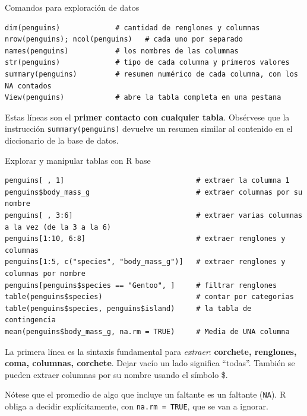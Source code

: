 \documentclass[aspectratio=169,10pt]{beamer}
\newcommand{\Rc}[1]{{\setlength{\fboxsep}{1.6pt}%
  \colorbox{codigoFondo}{\textcolor{codigoTexto}{\texttt{#1}}}}}
\newcommand{\destaca}[1]{%
  \par\vspace{3pt}\noindent
  \colorbox{azulClaro}{%
    \parbox{\dimexpr\linewidth-2\fboxsep\relax}{\vspace{3pt}#1\vspace{3pt}}}%
  \par\vspace{3pt}}
\begin{document}
\begin{frame}[fragile]{Comandos para exploración de datos}
\begin{lstlisting}
dim(penguins)             # cantidad de renglones y columnas
nrow(penguins); ncol(penguins)   # cada uno por separado
names(penguins)           # los nombres de las columnas
str(penguins)             # tipo de cada columna y primeros valores
summary(penguins)         # resumen numérico de cada columna, con los NA contados
View(penguins)            # abre la tabla completa en una pestana
\end{lstlisting}

  \vspace{0.3cm}
  \destaca{\small Estas líneas son el \textbf{primer contacto con cualquier
  tabla}.  Obsérvese que la instrucción \Rc{summary(penguins)} devuelve un resumen similar al contenido en el diccionario de la base de datos.}
\end{frame}

\begin{frame}[fragile]{Explorar y manipular tablas con R base}
\begin{lstlisting}
penguins[ , 1]                               # extraer la columna 1 
penguins$body_mass_g                         # extraer columnas por su nombre
penguins[ , 3:6]                             # extraer varias columnas a la vez (de la 3 a la 6)
penguins[1:10, 6:8]                          # extraer renglones y columnas
penguins[1:5, c("species", "body_mass_g")]   # extraer renglones y columnas por nombre
penguins[penguins$species == "Gentoo", ]     # filtrar renglones
table(penguins$species)                      # contar por categorias
table(penguins$species, penguins$island)     # la tabla de contingencia
mean(penguins$body_mass_g, na.rm = TRUE)     # Media de UNA columna
\end{lstlisting}

  \vspace{0.25cm}
  \destaca{\small La primera línea es la sintaxis fundamental para \textit{extraer}:
  \textbf{corchete, renglones, coma, columnas, corchete}. Dejar vacío un lado significa ``todas''. También se pueden extraer columnas por su nombre usando el símbolo \$.
  
  \vspace{0.15cm}
    \vspace{0.2cm}
  Nótese que el promedio de algo que incluye un faltante es un faltante (\texttt{NA}). R obliga a decidir
  explícitamente, con \Rc{na.rm = TRUE}, que se van a ignorar.}
\end{frame}
\end{document}
